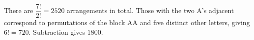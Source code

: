 There are $\dfrac{7!}{2!}=2520$ arrangements in total. Those with the two A's adjacent correspond to permutations of the block AA and five distinct other letters, giving $6!=720$. Subtraction gives $\boxed{1800}$.
